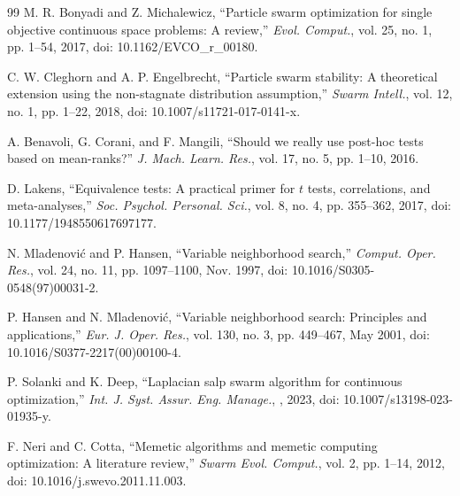 {\begin{thebibliography}{99}
M. R. Bonyadi and Z. Michalewicz, ``Particle swarm optimization for single objective continuous space problems: A review,'' \textit{Evol. Comput.}, vol. 25, no. 1, pp. 1--54, 2017, doi: 10.1162/EVCO\_r\_00180.

C. W. Cleghorn and A. P. Engelbrecht, ``Particle swarm stability: A theoretical extension using the non-stagnate distribution assumption,'' \textit{Swarm Intell.}, vol. 12, no. 1, pp. 1--22, 2018, doi: 10.1007/s11721-017-0141-x.

A. Benavoli, G. Corani, and F. Mangili, ``Should we really use post-hoc tests based on mean-ranks?'' \textit{J. Mach. Learn. Res.}, vol. 17, no. 5, pp. 1--10, 2016.

D. Lakens, ``Equivalence tests: A practical primer for $t$ tests, correlations, and meta-analyses,'' \textit{Soc. Psychol. Personal. Sci.}, vol. 8, no. 4, pp. 355--362, 2017, doi: 10.1177/1948550617697177.

N. Mladenovi\'c and P. Hansen, ``Variable neighborhood search,'' \textit{Comput. Oper. Res.}, vol. 24, no. 11, pp. 1097--1100, Nov. 1997, doi: 10.1016/S0305-0548(97)00031-2.

P. Hansen and N. Mladenovi\'c, ``Variable neighborhood search: Principles and applications,'' \textit{Eur. J. Oper. Res.}, vol. 130, no. 3, pp. 449--467, May 2001, doi: 10.1016/S0377-2217(00)00100-4.

P. Solanki and K. Deep, ``Laplacian salp swarm algorithm for continuous optimization,'' \textit{Int. J. Syst. Assur. Eng. Manage.}, , 2023, doi: 10.1007/s13198-023-01935-y.

F. Neri and C. Cotta, ``Memetic algorithms and memetic computing optimization: A literature review,'' \textit{Swarm Evol. Comput.}, vol. 2, pp. 1--14, 2012, doi: 10.1016/j.swevo.2011.11.003.


\end{thebibliography}}
